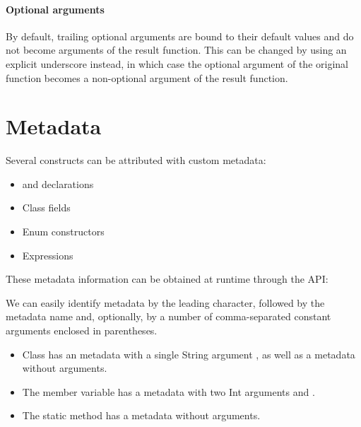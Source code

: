 \paragraph{Optional arguments}

By default, trailing optional arguments are bound to their default values and do not become arguments of the result function. This can be changed by using an explicit underscore \expr{_} instead, in which case the optional argument of the original function becomes a non-optional argument of the result function.




\section{Metadata}
\label{lf-metadata}

Several constructs can be attributed with custom metadata:

\begin{itemize}
	\item {} and  declarations
	\item Class fields
	\item Enum constructors
	\item Expressions
\end{itemize}

These metadata information can be obtained at runtime through the  API:


We can easily identify metadata by the leading  character, followed by the metadata name and, optionally, by a number of comma-separated constant arguments enclosed in parentheses.

\begin{itemize}
	\item Class  has an  metadata with a single String argument , as well as a  metadata without arguments.
	\item The member variable  has a  metadata with two Int arguments  and .
	\item The static method  has a  metadata without arguments.
\end{itemize}

